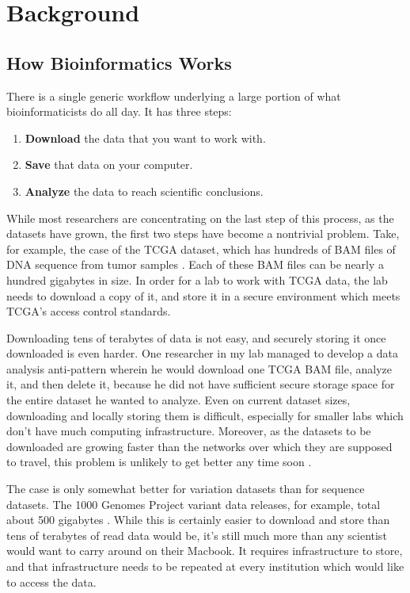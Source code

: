 \documentclass[11pt,proposal]{ucthesis}
\begin{document}
\chapter{Background}

\section{How Bioinformatics Works}

There is a single generic workflow underlying a large portion of what bioinformaticists do all day. It has three steps:

\begin{enumerate}
\item \textbf{Download} the data that you want to work with.
\item \textbf{Save} that data on your computer.
\item \textbf{Analyze} the data to reach scientific conclusions.
\end{enumerate}

While most researchers are concentrating on the last step of this process, as the datasets have grown, the first two steps have become a nontrivial problem. Take, for example, the case of the TCGA dataset, which has hundreds of BAM files of DNA sequence from tumor samples \cite{tcga2014sample}. Each of these BAM files can be nearly a hundred gigabytes in size. In order for a lab to work with TCGA data, the lab needs to download a copy of it, and store it in a secure environment which meets TCGA's access control standards.

Downloading tens of terabytes of data is not easy, and securely storing it once downloaded is even harder. One researcher in my lab managed to develop a data analysis anti-pattern wherein he would download one TCGA BAM file, analyze it, and then delete it, because he did not have sufficient secure storage space for the entire dataset he wanted to analyze. Even on current dataset sizes, downloading and locally storing them is difficult, especially for smaller labs which don't have much computing infrastructure. Moreover, as the datasets to be downloaded are growing faster than the networks over which they are supposed to travel, this problem is unlikely to get better any time soon \cite{stein2010case}.

The case is only somewhat better for variation datasets than for sequence datasets. The 1000 Genomes Project variant data releases, for example, total about 500 gigabytes \cite{10002013release}. While this is certainly easier to download and store than tens of terabytes of read data would be, it's still much more than any scientist would want to carry around on their Macbook. It requires infrastructure to store, and that infrastructure needs to be repeated at every institution which would like to access the data.
\end{document}
